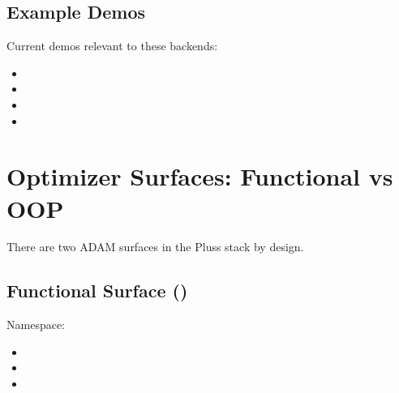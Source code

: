 \documentclass[letterpaper,10pt,english]{sphinxmanual}
\begin{document}
\section{Example Demos}
\label{\detokenize{optima_algorithms:example-demos}}
\sphinxAtStartPar
Current demos relevant to these backends:
\begin{itemize}
\item {} 
\sphinxAtStartPar
{}

\item {} 
\sphinxAtStartPar
{}

\item {} 
\sphinxAtStartPar
{}

\item {} 
\sphinxAtStartPar
{}

\end{itemize}

\sphinxstepscope


\chapter{Optimizer Surfaces: Functional vs OOP}
\label{\detokenize{optimizer_surfaces:optimizer-surfaces-functional-vs-oop}}\label{\detokenize{optimizer_surfaces::doc}}
\sphinxAtStartPar
There are two ADAM surfaces in the Pluss stack by design.


\section{Functional Surface ()}
\label{\detokenize{optimizer_surfaces:functional-surface-plussma}}
\sphinxAtStartPar
Namespace:
\begin{itemize}
\item {} 
\sphinxAtStartPar
{}

\item {} 
\sphinxAtStartPar
{}

\item {} 
\sphinxAtStartPar
{}

\end{itemize}
\end{document}
